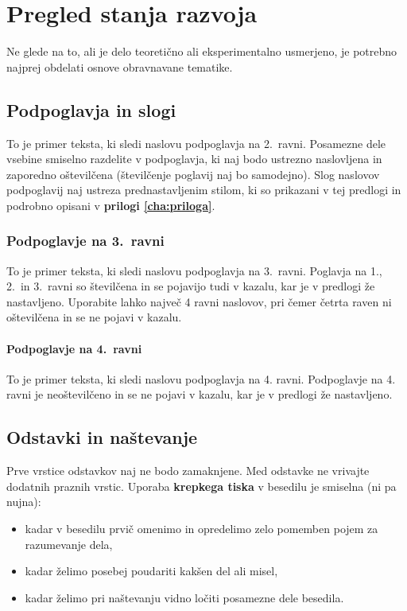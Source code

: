 \chapter{Pregled stanja razvoja}\label{cha:pregled}
Ne glede na to, ali je delo teoretično ali eksperimentalno usmerjeno, je potrebno najprej obdelati osnove obravnavane tematike.

\section{Podpoglavja in slogi}\label{sec:podpoglavja}
To je primer teksta, ki sledi naslovu podpoglavja na 2.~ravni. Posamezne dele vsebine smiselno razdelite v podpoglavja, ki naj bodo ustrezno naslovljena in zaporedno oštevilčena (številčenje poglavij naj bo samodejno). Slog naslovov podpoglavij naj ustreza prednastavljenim stilom, ki so prikazani v tej predlogi in podrobno opisani v \textbf{prilogi \ref{cha:priloga}}.

\subsection{Podpoglavje na 3.~ravni}\label{sec_podpoglavje_3}
To je primer teksta, ki sledi naslovu podpoglavja na 3.~ravni. Poglavja na 1., 2.~in 3.~ravni so številčena in se pojavijo tudi v kazalu, kar je v predlogi že nastavljeno. Uporabite lahko največ 4 ravni naslovov, pri čemer četrta raven ni oštevilčena in se ne pojavi v kazalu.

\subsubsection{Podpoglavje na 4.~ravni}
To je primer teksta, ki sledi naslovu podpoglavja na 4. ravni. Podpoglavje na 4. ravni je neoštevilčeno in se ne pojavi v kazalu, kar je v predlogi že nastavljeno.


\section{Odstavki in naštevanje}\label{sec:odstavki}
Prve vrstice odstavkov naj ne bodo zamaknjene. Med odstavke ne vrivajte dodatnih praznih vrstic. Uporaba \textbf{krepkega tiska} v besedilu je smiselna (ni pa nujna):
\begin{itemize}
\item kadar v besedilu prvič omenimo in opredelimo zelo pomemben pojem za razumevanje dela,
\item kadar želimo posebej poudariti kakšen del ali misel,
\item kadar želimo pri naštevanju vidno ločiti posamezne dele besedila.
\end{itemize}

